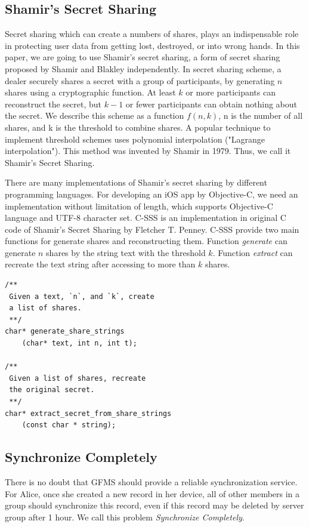 \documentclass[twocolumn,10pt]{article}
\begin{document}
\subsection{Shamir's Secret Sharing}
Secret sharing which can create a numbers of shares, plays an indispensable role in protecting user data from getting lost, destroyed, or into wrong hands. In this paper, we are going to use Shamir's secret sharing, a form of secret sharing proposed by Shamir and Blakley independently. In secret sharing scheme, a dealer securely shares a secret with a group of participants, by generating $n$ shares using a cryptographic function\cite{smith2013layered}. At least $k$ or more participants can reconstruct the secret, but $k-1$ or fewer participants can obtain nothing about the secret\cite{pang2005new}. We describe this scheme as a function $f(n, k)$, n is the number of all shares, and k is the threshold to combine shares. A popular technique to implement threshold schemes uses polynomial interpolation ("Lagrange interpolation"). This method was invented by Shamir in 1979. Thus, we call it Shamir's Secret Sharing.

There are many implementations of Shamir's secret sharing by different programming languages. For developing an iOS app by Objective-C, we need an implementation without limitation of length, which supports Objective-C language and UTF-8 character set. C-SSS\cite{c-sss} is an implementation in original C code of Shamir's Secret Sharing by Fletcher T. Penney. C-SSS provide two main functions for generate shares and reconstructing them. Function \emph{generate} can generate $n$ shares by the string text with the threshold $k$. Function \emph{extract} can recreate the text string after accessing to more than $k$ shares.

\begin{lstlisting}[language={[ANSI]C}, numberstyle=\tiny,keywordstyle=\color{blue!70},commentstyle=\color{red!50!green!50!blue!50},frame=shadowbox, rulesepcolor=\color{red!20!green!20!blue!20}]
/**
 Given a text, `n`, and `k`, create 
 a list of shares.
 **/
char* generate_share_strings
	(char* text, int n, int t);

/**
 Given a list of shares, recreate 
 the original secret.
 **/
char* extract_secret_from_share_strings
	(const char * string);
\end{lstlisting}

\subsection{Synchronize Completely}
There is no doubt that GFMS should provide a reliable synchronization service. For Alice, once she created a new record in her device, all of other members in a group should synchronize this record, even if this record may be deleted by server group after 1 hour. We call this problem \emph{Synchronize Completely}.
\end{document}
